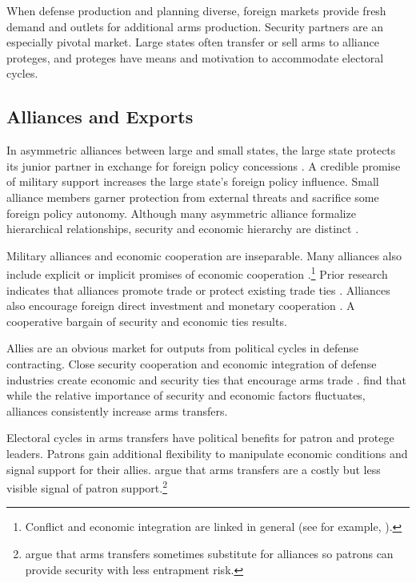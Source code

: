 \documentclass[12pt]{article}
\begin{document}
When defense production and planning diverse, foreign markets provide fresh demand and outlets for additional arms production. 
Security partners are an especially pivotal market.
Large states often transfer or sell arms to alliance proteges, and proteges have means and motivation to accommodate electoral cycles. 



\subsection{Alliances and Exports}


In asymmetric alliances between large and small states, the large state protects its junior partner in exchange for foreign policy concessions \citep{Morrow1991}.
A credible promise of military support increases the large state's foreign policy influence. 
Small alliance members garner protection from external threats and sacrifice some foreign policy autonomy. 
Although many asymmetric alliance formalize hierarchical relationships, security and economic hierarchy are distinct \citep{Lake2009}. 


Military alliances and economic cooperation are inseparable.
Many alliances also include explicit or implicit promises of economic cooperation \citep{GowaMansfield2004, LongLeeds2006, Davis2008, Poast2012}.\footnote{Conflict and economic integration are linked in general (see for example, \citep{GartzkeLi2003, Chen2021}).}
Prior research indicates that alliances promote trade \citep{Gowa1995, GowaMansfield2004, Haim2016} or protect existing trade ties \citep{Fordham2010}.
Alliances also encourage foreign direct investment \citep{LiVashchilko2010} and monetary cooperation \citep{Li2003}.
A cooperative bargain of security and economic ties results. 


Allies are an obvious market for outputs from political cycles in defense contracting.
Close security cooperation and economic integration of defense industries create economic and security ties that encourage arms trade \citep{Bitzinger1994}. 
\citet{Thurneretal2019} find that while the relative importance of security and economic factors fluctuates, alliances consistently increase arms transfers.


Electoral cycles in arms transfers have political benefits for patron and protege leaders.
Patrons gain additional flexibility to manipulate economic conditions and signal support  for their allies. 
\citet{McManusYarhi-Milo2017} argue that arms transfers are a costly but less visible signal of patron support.\footnote{\citet{Yarhi-Miloetal2016} argue that arms transfers sometimes substitute for alliances so patrons can provide security with less entrapment risk.}
\end{document}
